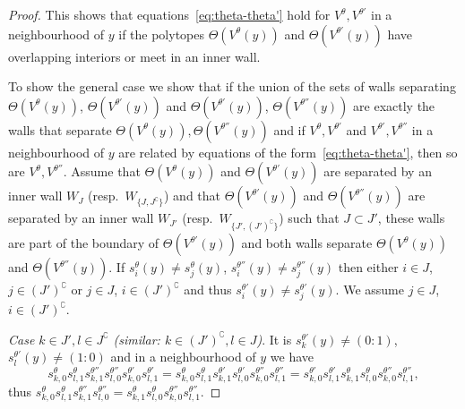 \documentclass[ALCO,ThmDefs,Unicode,epreuves]{cedram}
\begin{document}
\begin{proof}
This shows that equations~\eqref{eq:theta-theta'} hold for $V^\theta,V^{\theta'}$
in a neighbourhood of $y$ if the polytopes $\Theta(V^\theta(y))$ and 
$\Theta(V^{\theta'}(y))$ have overlapping interiors or meet in an inner wall.

To show the general case we show that if the union of the sets of walls separating
$\Theta(V^\theta(y))$, $\Theta(V^{\theta'}(y))$ and 
$\Theta(V^{\theta'}(y))$, $\Theta(V^{\theta''}(y))$ are exactly the walls that separate 
$\Theta(V^\theta(y)),\Theta(V^{\theta''}(y))$ and if $V^\theta,V^{\theta'}$ and
$V^{\theta'},V^{\theta''}$ in a neighbourhood of $y$ are related by equations of 
the form~\eqref{eq:theta-theta'}, then so are $V^\theta,V^{\theta''}$.
Assume that $\Theta(V^\theta(y))$ and $\Theta(V^{\theta'}(y))$ are separated by an
inner wall $W_J$ (resp.\ $W_{\{J,J^\complement\}}$) and that $\Theta(V^{\theta'}(y))$ 
and $\Theta(V^{\theta''}(y))$ are separated by an inner wall $W_{J'}$ (resp.\ 
$W_{\{J',(J')^\complement\}}$) such that $J\subset J'$, these walls are part 
of the boundary of $\Theta(V^{\theta'}(y))$ and both walls separate 
$\Theta(V^\theta(y))$ and $\Theta(V^{\theta''}(y))$. 
If $s_i^\theta(y)\neq s_j^\theta(y)$, $s_i^{\theta''}(y)\neq s_j^{\theta''}(y)$
then either $i\in J$, $j\in(J')^\complement$ or $j\in J$, $i\in(J')^\complement$ 
and thus $s_i^{\theta'}(y)\neq s_j^{\theta'}(y)$. 
We assume $j\in J$, $i\in(J')^\complement$.

\emph{Case $k\in J',l\in J^\complement$ (similar: $k\in (J')^\complement,l\in J$)}.
It is $s^{\theta'}_k(y)\neq (0:1)$, $s^{\theta'}_l(y)\neq(1:0)$ and in 
a neighbourhood of $y$ we have 
\[
s^\theta_{k,0}s^\theta_{l,1}
s^{\theta''}_{k,1}s^{\theta''}_{l,0}s^{\theta'}_{k,0}s^{\theta'}_{l,1}
=s^\theta_{k,0}s^\theta_{l,1}
s^{\theta'}_{k,1}s^{\theta'}_{l,0}s^{\theta''}_{k,0}s^{\theta''}_{l,1}
=s^{\theta'}_{k,0}s^{\theta'}_{l,1}s^\theta_{k,1}s^\theta_{l,0}
s^{\theta''}_{k,0}s^{\theta''}_{l,1},
\]
thus 
$s^\theta_{k,0}s^\theta_{l,1}s^{\theta''}_{k,1}s^{\theta''}_{l,0}
=s^\theta_{k,1}s^\theta_{l,0}s^{\theta''}_{k,0}s^{\theta''}_{l,1}$.


\end{proof}
\end{document}
